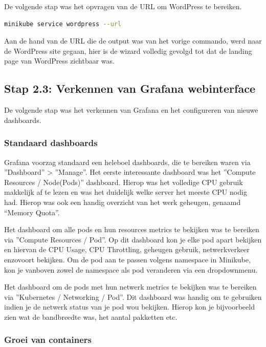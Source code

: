 De volgende stap was het opvragen van de URL om WordPress te bereiken.

\begin{lstlisting}[language=bash,caption={URL WordPress}]
    minikube service wordpress --url
\end{lstlisting}

Aan de hand van de URL die de output was van het vorige commando, werd naar de WordPress site gegaan, hier is de wizard volledig gevolgd tot dat de landing page van WordPress zichtbaar was.

\subsection{Stap 2.3: Verkennen van Grafana webinterface}

De volgende stap was het verkennen van Grafana en het configureren van nieuwe dashboards.

\subsubsection{Standaard dashboards}

Grafana voorzag standaard een heleboel dashboards, die te bereiken waren via ''Dashboard'' > ''Manage''. Het eerste interessante dashboard was het ''Compute Resources / Node(Pods)'' dashboard. Hierop was het volledige CPU gebruik makkelijk af te lezen en was het duidelijk welke server het meeste CPU nodig had. Hierop was ook een handig overzicht van het werk geheugen, genaamd “Memory Quota”.

Het dashboard om alle pods en hun resources metrics te bekijken was te bereiken via ''Compute Resources / Pod''. Op dit dashboard kon je elke pod apart bekijken en hiervan de CPU Usage, CPU Throttling, geheugen gebruik, netwerkverkeer enzovoort bekijken. Om de pod aan te passen volgens namespace in Minikube, kon je vanboven zowel de namespace als pod veranderen via een dropdownmenu. 

Het dashboard om de pods met hun netwerk metrics te bekijken was te bereiken via ''Kubernetes / Networking / Pod''. Dit dashboard was handig om te gebruiken indien je de netwerk status van je pod wou bekijken. Hierop kon je bijvoorbeeld zien wat de bandbreedte was, het aantal pakketten etc. 

\subsubsection{Groei van containers}\label{sssec:Groeivancontainers}

